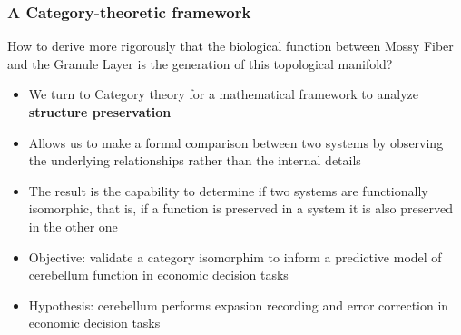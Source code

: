 \documentclass[aspectratio=169]{beamer}
\begin{document}
	\begin{frame}
		\frametitle{A Category-theoretic framework}
		How to derive more rigorously that the biological function between Mossy Fiber and the Granule Layer is the generation of this topological manifold? 
		\begin{itemize}
			\item We turn to Category theory for a mathematical framework to analyze \textbf{structure preservation}
			\item Allows us to make a formal comparison between two systems by observing the underlying relationships rather than the internal details
			\item The result is the capability to determine if two systems are functionally isomorphic, that is, if a function is preserved in a system it is also preserved in the other one
			\item Objective: validate a category isomorphim to inform a predictive model of cerebellum function in economic decision tasks
			\item Hypothesis: cerebellum performs expasion recording and error correction in economic decision tasks
		\end{itemize}
	\end{frame}
	
\end{document}
